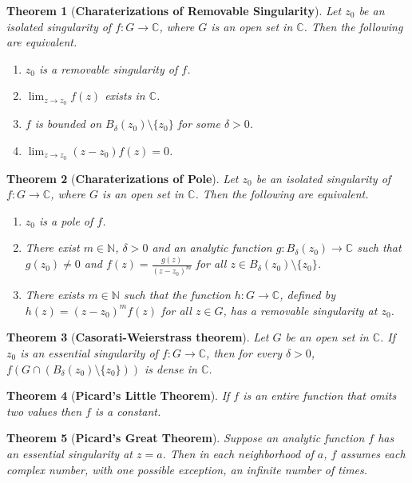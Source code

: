 \documentclass[answers, a4paper, 12pt]{exam}
\newtheorem{theorem}{Theorem}[section]
\newcommand{\C}{\mathbb{C}}
\newcommand{\N}{\mathbb{N}}
\begin{document}
\begin{theorem}[\textbf{Charaterizations of Removable Singularity}]
    Let $z_0$ be an isolated singularity of $f:G\to\C$, where $G$ is an open set in $\C$. Then the following are equivalent.
    \begin{enumerate}
        \item $z_0$ is a removable singularity of $f$.
        \item $\displaystyle\lim_{z\to z_0}{f(z)}$ exists in $\C$.
        \item $f$ is bounded on $B_{\delta}{(z_0)}\setminus\{z_0\}$ for some $\delta>0$.
        \item $\displaystyle\lim_{z\to z_0}{(z-z_0)f(z)}=0$.
    \end{enumerate}
\end{theorem}

\begin{theorem}[\textbf{Charaterizations of Pole}]
    Let $z_0$ be an isolated singularity of $f:G\to\C$, where $G$ is an open set in $\C$. Then the following are equivalent.
    \begin{enumerate}
        \item $z_0$ is a pole of $f$.
        \item There exist $m\in\N$, $\delta>0$ and an analytic function $g:B_{\delta}{(z_0)}\to\C$ such that $g(z_0)\neq 0$ and $f(z)=\frac{g(z)}{(z-z_0)^m}$ for all $z\in B_{\delta}{(z_0)}\setminus\{z_0\}$.
        \item There exists $m\in\N$ such that the function $h:G\to\C$, defined by $h(z)=(z-z_0)^mf(z)$ for all $z\in G$, has a removable singularity at $z_0$.
    \end{enumerate}
\end{theorem}

\begin{theorem}[\textbf{Casorati-Weierstrass theorem}]
    Let $G$ be an open set in $\C$. If $z_0$ is an essential singularity of $f:G\to\C$, then for every $\delta>0$, $f(G\cap(B_{\delta}{(z_0)}\setminus\{z_0\}))$ is dense in $\C$.
\end{theorem}

\begin{theorem}[\textbf{Picard's Little Theorem}]
    If $f$ is an entire function that omits two values then $f$ is a constant.
\end{theorem}

\begin{theorem}[\textbf{Picard's Great Theorem}]
    Suppose an analytic function $f$ has an essential singularity at $z=a$. Then in each neighborhood of $a$, $f$ assumes each complex number, with one possible exception, an infinite number of times.
\end{theorem}
\end{document}
